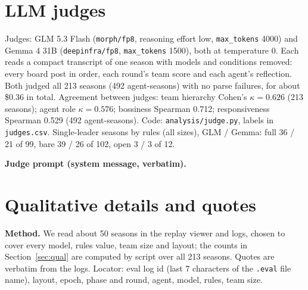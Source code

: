 \documentclass{article}
\begin{document}
\section{LLM judges}\label{app:judge}
Judges: GLM 5.3 Flash (\texttt{morph/fp8}, reasoning effort low, \texttt{max\_tokens} 4000) and Gemma 4 31B (\texttt{deepinfra/fp8}, \texttt{max\_tokens} 1500), both at temperature 0. Each reads a compact transcript of one season with models and conditions removed: every board post in order, each round's team score and each agent's reflection. Both judged all 213 seasons (492 agent-seasons) with no parse failures, for about \$0.36 in total. Agreement between judges: team hierarchy Cohen's $\kappa=0.626$ (213 seasons); agent role $\kappa=0.576$; bossiness Spearman 0.712; responsiveness Spearman 0.529 (492 agent-seasons). Code: \texttt{analysis/judge.py}, labels in \texttt{judges.csv}. Single-leader seasons by rules (all sizes), GLM / Gemma: full 36 / 21 of 99, bare 39 / 26 of 102, open 3 / 3 of 12.

\textbf{Judge prompt (system message, verbatim).}

\section{Qualitative details and quotes}\label{app:quotes}
\textbf{Method.} We read about 50 seasons in the replay viewer and logs, chosen to cover every model, rules value, team size and layout; the counts in Section~\ref{sec:qual} are computed by script over all 213 seasons. Quotes are verbatim from the logs. Locator: eval log id (last 7 characters of the \texttt{.eval} file name), layout, epoch, phase and round, agent, model, rules, team size.
\end{document}
